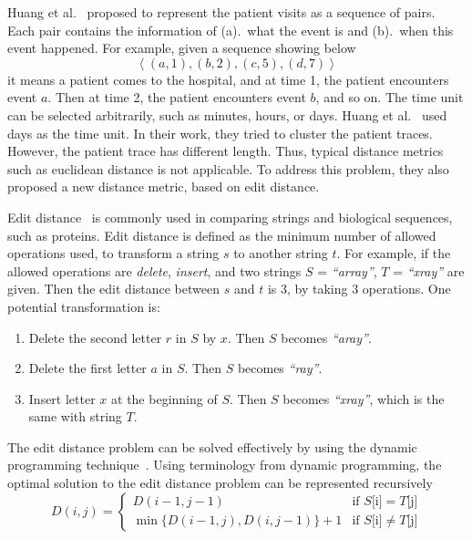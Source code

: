 Huang et al.~\cite{huang2012anomaly} proposed to represent the patient visits as a sequence of pairs. Each pair contains the information of (a).~what the event is and (b).~when this event happened. For example, given a sequence showing below
$$
\left\langle(a, 1), (b, 2), (c, 5), (d, 7)\right\rangle 
$$
it means a patient comes to the hospital, and at time 1, the patient encounters event $a$. Then at time 2, the patient encounters event $b$, and so on. The time unit can be selected arbitrarily, such as minutes, hours, or days. Huang et al.~\cite{huang2012anomaly} used days as the time unit. In their work, they tried to cluster the patient traces. However, the patient trace has different length. Thus, typical distance metrics such as euclidean distance is not applicable. To address this problem, they also proposed a new distance metric, based on edit distance.

Edit distance~\cite{cormen2009introduction} is commonly used in comparing strings and biological sequences, such as proteins. Edit distance is defined as the minimum number of allowed operations used, to transform a string $s$ to another string $t$. For example, if the allowed operations are \textit{delete}, \textit{insert}, and two strings $S$ = \textit{``array''}, $T$ = \textit{``xray''} are given. Then the edit distance between $s$ and $t$ is 3, by taking 3 operations. One potential transformation is: 
\begin{enumerate}
	\item Delete the second letter $r$ in $S$ by $x$. Then $S$ becomes \textit{``aray''}.
	\item Delete the first letter $a$ in $S$. Then $S$ becomes \textit{``ray''}.
	\item Insert letter $x$ at the beginning of $S$. Then $S$ becomes \textit{``xray''}, which is the same with string $T$.
\end{enumerate}

The edit distance problem can be solved effectively by using the dynamic programming technique~\cite{cormen2009introduction}. Using terminology from dynamic programming, the optimal solution to the edit distance problem can be represented recursively
\begin{equation*}
D(i, j) = \begin{cases} 
   D(i-1, j-1) & \text{if } S\text{[i]} = T\text{[j]} \\
   \min\{D(i-1, j), D(i, j-1)\} + 1       & \text{if } S\text{[i]} \neq T\text{[j]}
  \end{cases}
\end{equation*}

